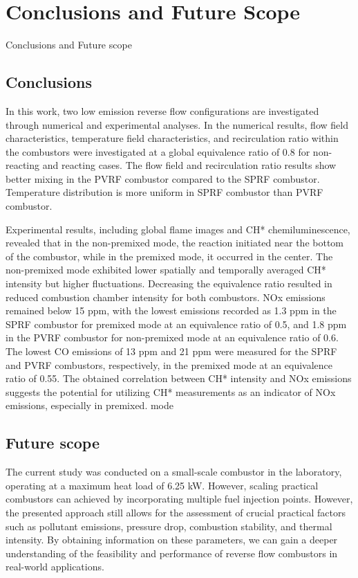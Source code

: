 \chapter[Conclusions and Future scope]{Conclusions and Future Scope}{Conclusions and Future scope}\label{CH:CFS}

\section{Conclusions}
In this work, two low emission reverse flow configurations are investigated through numerical and experimental analyses. In the numerical results, flow field characteristics, temperature field characteristics, and recirculation ratio within the combustors were investigated at a global equivalence ratio of 0.8 for non-reacting and reacting cases. The flow field and recirculation ratio results show better mixing in the PVRF combustor compared to the SPRF combustor. Temperature distribution is more uniform in SPRF combustor than PVRF combustor.  

Experimental results, including global flame images and CH* chemiluminescence, revealed that in the non-premixed mode, the reaction initiated near the bottom of the combustor, while in the premixed mode, it occurred in the center. The non-premixed mode exhibited lower spatially and temporally averaged CH* intensity but higher fluctuations. Decreasing the equivalence ratio resulted in reduced combustion chamber intensity for both combustors. NOx emissions remained below 15 ppm, with the lowest emissions recorded as 1.3 ppm in the SPRF combustor for premixed mode at an equivalence ratio of 0.5, and 1.8 ppm in the PVRF combustor for non-premixed mode at an equivalence ratio of 0.6. The lowest CO emissions of 13 ppm and 21 ppm were measured for the SPRF and PVRF combustors, respectively, in the premixed mode at an equivalence ratio of 0.55. The obtained correlation between CH* intensity and NOx emissions suggests the potential for utilizing CH* measurements as an indicator of NOx emissions, especially in premixed. 
mode

\section{Future scope}
The current study was conducted on a small-scale combustor in the laboratory, operating at a maximum heat load of 6.25 kW. However, scaling practical combustors can achieved by incorporating multiple fuel injection points. However, the presented approach still allows for the assessment of crucial practical factors such as pollutant emissions, pressure drop, combustion stability, and thermal intensity. By obtaining information on these parameters, we can gain a deeper understanding of the feasibility and performance of reverse flow combustors in real-world applications.


